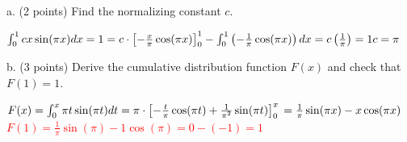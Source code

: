 \documentclass[11pt]{article}
\begin{document}
a. (2 points) Find the normalizing constant $c$.

\textcolor{red}{
$\int_0^1 c x \sin(\pi x) dx = 1\\
= c \cdot \left[ -\frac{x}{\pi}\cos(\pi x) \right]_0^1 - \int_0^1 \left(-\frac{1}{\pi}\cos(\pi x)\right) dx\\
= c \left( \frac{1}{\pi} \right) = 1\\
c = \pi
$
}

b. (3 points) Derive the cumulative distribution function $F(x)$ and check that $F(1)=1$.

\textcolor{red}{
$F(x) = \int_0^x \pi t \sin(\pi t) dt\\
= \pi \cdot \left[ -\frac{t}{\pi}\cos(\pi t) + \frac{1}{\pi^2}\sin(\pi t) \right]_0^x\\
= \frac{1}{\pi}\sin(\pi x) - x\cos(\pi x)$\\
$F(1) = \frac{1}{\pi}\sin(\pi) - 1\cos(\pi) = 0 - (-1) = 1$
}
\end{document}
